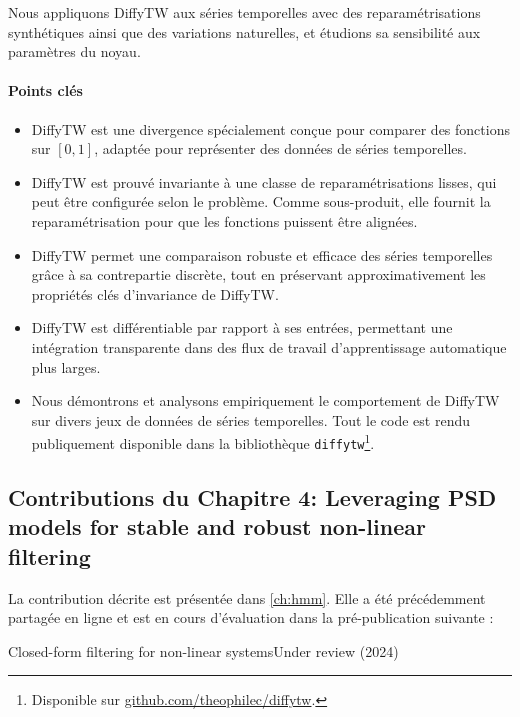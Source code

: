 Nous appliquons DiffyTW aux séries temporelles avec des reparamétrisations synthétiques ainsi que des variations naturelles, et étudions sa sensibilité aux paramètres du noyau.

\paragraph{Points clés}
\begin{itemize}
    \item DiffyTW est une divergence spécialement conçue pour comparer des fonctions sur $[0,1]$, adaptée pour représenter des données de séries temporelles.
    \item DiffyTW est prouvé invariante à une classe de reparamétrisations lisses, qui peut être configurée selon le problème. Comme sous-produit, elle fournit la reparamétrisation pour que les fonctions puissent être alignées.
    \item DiffyTW permet une comparaison robuste et efficace des séries temporelles grâce à sa contrepartie discrète, tout en préservant approximativement les propriétés clés d'invariance de DiffyTW.
    \item DiffyTW est différentiable par rapport à ses entrées, permettant une intégration transparente dans des flux de travail d'apprentissage automatique plus larges.
    \item Nous démontrons et analysons empiriquement le comportement de DiffyTW sur divers jeux de données de séries temporelles. Tout le code est rendu publiquement disponible dans la bibliothèque \texttt{diffytw}\footnote{Disponible sur \url{github.com/theophilec/diffytw}.}.
\end{itemize}

\subsection{Contributions du Chapitre 4: Leveraging PSD models for stable and robust non-linear filtering}
\begin{mdframed}
La contribution décrite est présentée dans \cref{ch:hmm}.
\noindent Elle a été précédemment partagée en ligne et est en cours d'évaluation dans la pré-publication suivante :
\begin{mdframed}
{Closed-form filtering for non-linear systems}{Under review (2024)}
\end{mdframed}
\end{mdframed}
